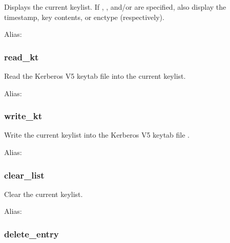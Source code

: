 \documentclass[letterpaper,10pt,english]{sphinxmanual}
\begin{document}
Displays the current keylist.  If , , and/or  are
specified, also display the timestamp, key contents, or enctype
(respectively).

Alias: 


\subsubsection{read\_kt}
\label{\detokenize{admin/admin_commands/ktutil:read-kt}}\begin{quote}

 
\end{quote}

Read the Kerberos V5 keytab file  into the current keylist.

Alias: 


\subsubsection{write\_kt}
\label{\detokenize{admin/admin_commands/ktutil:write-kt}}\begin{quote}

 
\end{quote}

Write the current keylist into the Kerberos V5 keytab file .

Alias: 


\subsubsection{clear\_list}
\label{\detokenize{admin/admin_commands/ktutil:clear-list}}\begin{quote}

\end{quote}

Clear the current keylist.

Alias: 


\subsubsection{delete\_entry}
\label{\detokenize{admin/admin_commands/ktutil:delete-entry}}\begin{quote}

 
\end{quote}
\end{document}
